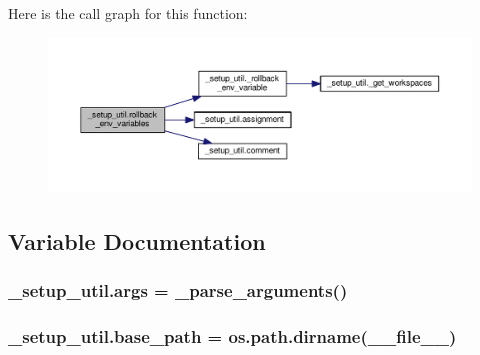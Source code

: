Here is the call graph for this function\+:
\nopagebreak
\begin{figure}[H]
\begin{center}
\leavevmode
\includegraphics[width=350pt]{namespace__setup__util_af3030db6102b5aa35cd354a2fb6cca03_cgraph}
\end{center}
\end{figure}




\subsection{Variable Documentation}
\subsubsection[{\texorpdfstring{args}{args}}]{\setlength{\rightskip}{0pt plus 5cm}\+\_\+setup\+\_\+util.\+args = {\bf \+\_\+parse\+\_\+arguments}()}\hypertarget{namespace__setup__util_a547963d07c6371df1c51b1384a2dec28}{}\label{namespace__setup__util_a547963d07c6371df1c51b1384a2dec28}
\subsubsection[{\texorpdfstring{base\+\_\+path}{base_path}}]{\setlength{\rightskip}{0pt plus 5cm}\+\_\+setup\+\_\+util.\+base\+\_\+path = os.\+path.\+dirname(\+\_\+\+\_\+file\+\_\+\+\_\+)}\hypertarget{namespace__setup__util_a83d25140acd7788bbcb95843fe38e639}{}\label{namespace__setup__util_a83d25140acd7788bbcb95843fe38e639}
